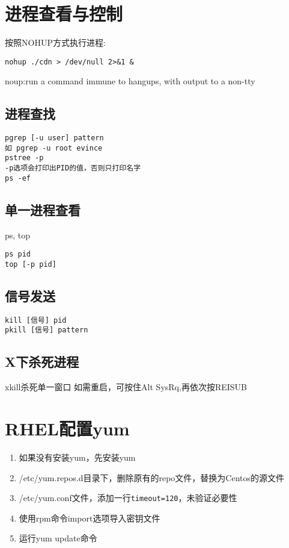 \section{进程查看与控制}

按照NOHUP方式执行进程:
\begin{verbatim}
nohup ./cdn > /dev/null 2>&1 &
\end{verbatim}
noup:run a command immune to hangups, with output to a non-tty

\subsection{进程查找}
\begin{verbatim}
pgrep [-u user] pattern
如 pgrep -u root evince
pstree -p
-p选项会打印出PID的值，否则只打印名字
ps -ef
\end{verbatim}

\subsection{单一进程查看}
ps, top
\begin{verbatim}
ps pid
top [-p pid]
\end{verbatim}


\subsection{信号发送}
\begin{verbatim}
kill [信号] pid
pkill [信号] pattern
\end{verbatim}

\subsection{X下杀死进程}
xkill杀死单一窗口
如需重启，可按住Alt SysRq,再依次按REISUB



\section{RHEL配置yum}

\begin{enumerate}
    \item 如果没有安装yum，先安装yum
    \item /etc/yum.repos.d目录下，删除原有的repo文件，替换为Centos的源文件
    \item /etc/yum.conf文件，添加一行\verb+timeout=120+，未验证必要性
    \item 使用rpm命令import选项导入密钥文件
    \item 运行yum update命令
\end{enumerate}

